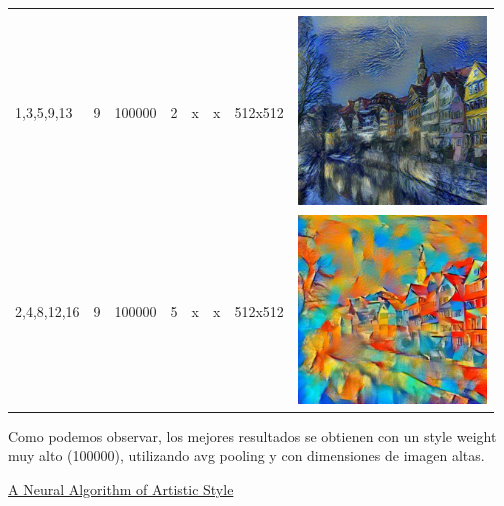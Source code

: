 \documentclass[a4paper, 11pt]{article}
\begin{document}
\begin{longtable}{| m{2.5cm} | m{0.5cm} | m{1.2cm} | m{0.5cm} | m{0.5cm} | m{1cm} | m{1.6cm} | c |}
\begin{minipage}{.3\textwidth}
					\end{minipage} \\
					1,3,5,9,13                          & 9                                   & 100000                            & 2                                   & x                                  & x                             & 512x512                         & 
					\begin{minipage}{.3\textwidth}
						\includegraphics[width=1\linewidth, height=50mm]{pics/image8}
					\end{minipage} \\
					2,4,8,12,16                         & 9                                   & 100000                            & 5                                   & x                                  & x                             & 512x512                         & 
					\begin{minipage}{.3\textwidth}
						\includegraphics[width=1\linewidth, height=50mm]{pics/image9}
					\end{minipage} \\ \hline
				\end{longtable}
   		
   			Como podemos observar, los mejores resultados se obtienen con un style weight muy alto (100000), utilizando avg pooling y con dimensiones de imagen altas.
    
\begin{thebibliography}{50}
	\href{https://arxiv.org/pdf/1508.06576.pdf}{A Neural Algorithm of Artistic Style}
\end{thebibliography}
\end{document}
